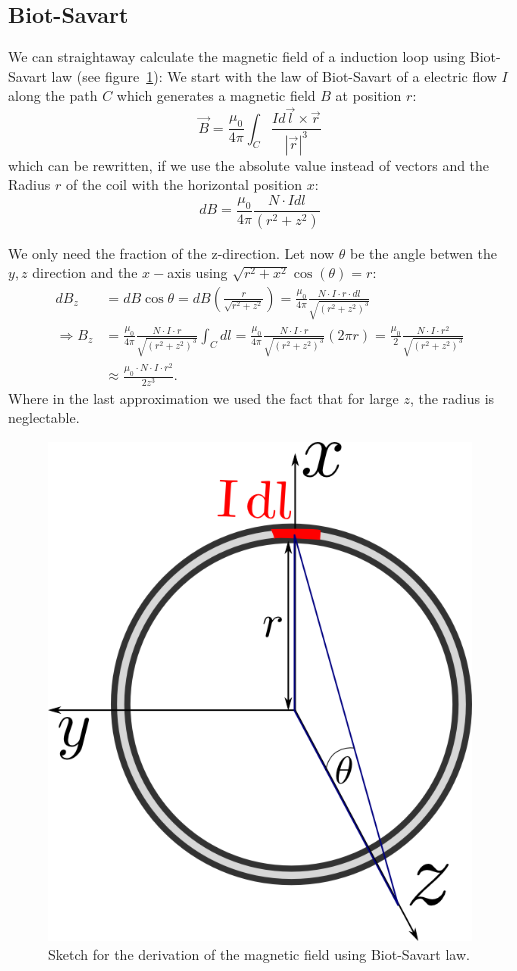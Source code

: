 \subsection{Biot-Savart}
We can straightaway calculate the magnetic field of a induction loop using
Biot-Savart law (see figure~\ref{fig:magnetic_field}):
We start with the law of Biot-Savart of a electric flow $I$ along the path $C$ which generates
a magnetic field $B$ at position $r$:
\begin{equation}
    \vec{B} = \frac{\mu_0}{4\pi} \int_{C} \frac{I d\vec{l} \times \vec{r}}{|\vec{r}|^3} 
\end{equation}
which can be rewritten, if we use the absolute value instead of vectors and the Radius $r$ of the
coil with the horizontal position $x$:
\begin{equation}
    dB = \frac{\mu_0}{4\pi} \frac{N \cdot I dl}{(r^2 + z^2)} 
\end{equation}

We only need the fraction of the z-direction. Let now $\theta$ be the angle betwen the $y,z$ 
direction and the $x-$axis using $\sqrt{{r}^2 + x^2} \cos(\theta) = {r}$:
\begin{align}
     dB_z &= dB \cos\theta = dB \left (\frac{{r}}{\sqrt{{r}^2 + z^2}} \right) = 
    \frac{\mu_0}{4\pi} \frac{N\cdot I  \cdot {r} \cdot dl}{\sqrt{\left ({r}^2 + z^2 \right )^3}} \\
\Rightarrow B_z &= \frac{\mu_0}{4\pi} \frac{N\cdot I  \cdot {r}}{\sqrt{\left ({r}^2 + z^2 \right )^3}} \int_C dl 
  = \frac{\mu_0}{4\pi} \frac{N\cdot I  \cdot {r}}{\sqrt{\left ({r}^2 + z^2 \right )^3}} \left (2\pi {r} \right )
  =  \frac{\mu_0}{2} \frac{N\cdot I  \cdot {r}^2}{\sqrt{\left ({r}^2 + z^2 \right )^3}} \\
  &\approx \frac{\mu_0\cdot N \cdot I \cdot r^2}{2z^3}. \label{eq:aprox1}
\end{align}
Where in the last approximation we used the fact that for large $z$, the
radius is neglectable.
\begin{figure}[htpb]
    \centering
    \includegraphics[width=0.4\linewidth]{figures/magnetic_field}
    \caption{Sketch for the derivation of the magnetic field using Biot-Savart law.}
    \label{fig:magnetic_field}
\end{figure}
